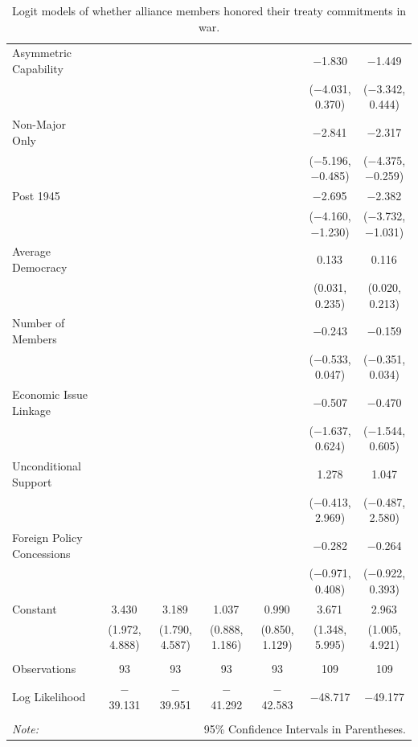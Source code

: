 \documentclass[12pt]{article}
\begin{document}
\begin{table}[!htbp]
\begin{adjustbox}{width= .95\textwidth, center}
\begin{tabular}{@{\extracolsep{5pt}}lcccccc}
  Asymmetric Capability &  &  &  &  & $-$1.830 & $-$1.449 \\ 
  &  &  &  &  & ($-$4.031, 0.370) & ($-$3.342, 0.444) \\ 
  Non-Major Only &  &  &  &  & $-$2.841$^{}$ & $-$2.317$^{}$ \\ 
  &  &  &  &  & ($-$5.196, $-$0.485) & ($-$4.375, $-$0.259) \\ 
  Post 1945 &  &  &  &  & $-$2.695$^{}$ & $-$2.382$^{}$ \\ 
  &  &  &  &  & ($-$4.160, $-$1.230) & ($-$3.732, $-$1.031) \\ 
  Average Democracy &  &  &  &  & 0.133$^{}$ & 0.116$^{}$ \\ 
  &  &  &  &  & (0.031, 0.235) & (0.020, 0.213) \\ 
  Number of Members &  &  &  &  & $-$0.243 & $-$0.159 \\ 
  &  &  &  &  & ($-$0.533, 0.047) & ($-$0.351, 0.034) \\ 
  Economic Issue Linkage &  &  &  &  & $-$0.507 & $-$0.470 \\ 
  &  &  &  &  & ($-$1.637, 0.624) & ($-$1.544, 0.605) \\ 
  Unconditional Support &  &  &  &  & 1.278 & 1.047 \\ 
  &  &  &  &  & ($-$0.413, 2.969) & ($-$0.487, 2.580) \\ 
  Foreign Policy Concessions &  &  &  &  & $-$0.282 & $-$0.264 \\ 
  &  &  &  &  & ($-$0.971, 0.408) & ($-$0.922, 0.393) \\ 
  Constant & 3.430$^{}$ & 3.189$^{}$ & 1.037$^{}$ & 0.990$^{}$ & 3.671$^{}$ & 2.963$^{}$ \\ 
  & (1.972, 4.888) & (1.790, 4.587) & (0.888, 1.186) & (0.850, 1.129) & (1.348, 5.995) & (1.005, 4.921) \\ 
 \hline \\[-1.8ex] 
Observations & 93 & 93 & 93 & 93 & 109 & 109 \\ 
Log Likelihood & $-$39.131 & $-$39.951 & $-$41.292 & $-$42.583 & $-$48.717 & $-$49.177 \\ 
\hline 
\hline \\[-1.8ex] 
\textit{Note:}  & \multicolumn{6}{r}{95\% Confidence Intervals in Parentheses.} \\ 
\end{tabular} 
\end{adjustbox} 
  \caption{Logit models of whether alliance members honored their treaty commitments in war.} 
  \label{tab:depth-performance}  
\end{table} 
\end{document}

